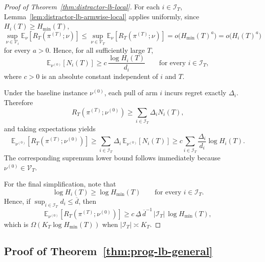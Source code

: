 \documentclass[11pt]{article}
\begin{document}
\begin{proof}[Proof of Theorem~\ref{thm:distractor-lb-local}]
For each $i\in\mathcal I_T$, Lemma~\ref{lem:distractor-lb-armwise-local}
applies uniformly, since $H_i(T)\ge H_{\min}(T),$
\[
\sup_{\nu\in\mathcal V_i}\mathbb E_\nu[R_T(\pi^{(T)};\nu)]
\le
\sup_{\nu\in\mathcal V_T}\mathbb E_\nu[R_T(\pi^{(T)};\nu)]
=
o\bigl(H_{\min}(T)^a\bigr)
=
o\bigl(H_i(T)^a\bigr)
\]
for every $a>0$. Hence, for all sufficiently large $T$,
\[
\mathbb E_{\nu^{(0)}}[N_i(T)]
\ge
c\,\frac{\log H_i(T)}{d_i}
\qquad
\text{for every }i\in\mathcal I_T,
\]
where $c>0$ is an absolute constant independent of $i$ and $T$.

Under the baseline instance $\nu^{(0)}$, each pull of arm $i$ incurs regret
exactly $\Delta_i$. Therefore
\[
R_T(\pi^{(T)};\nu^{(0)})
\ge
\sum_{i\in\mathcal I_T}\Delta_i N_i(T),
\]
and taking expectations yields
\[
\mathbb E_{\nu^{(0)}}[R_T(\pi^{(T)};\nu^{(0)})]
\ge
\sum_{i\in\mathcal I_T}\Delta_i\,\mathbb E_{\nu^{(0)}}[N_i(T)]
\ge
c\sum_{i\in\mathcal I_T}\frac{\Delta_i}{d_i}\log H_i(T).
\]
The corresponding supremum lower bound follows immediately because
$\nu^{(0)}\in\mathcal V_T$.

For the final simplification, note that
\[
\log H_i(T)\ge \log H_{\min}(T)
\qquad
\text{for every }i\in\mathcal I_T.
\]
Hence, if $\sup_{i\in\mathcal I_T}d_i\le \overline d$, then
\[
\mathbb E_{\nu^{(0)}}[R_T(\pi^{(T)};\nu^{(0)})]
\ge
c\,\underline\Delta\,\overline d^{-1}\,|\mathcal I_T|\,\log H_{\min}(T),
\]
which is $\Omega(K_T\log H_{\min}(T))$ when
$|\mathcal I_T|\asymp K_T$.
\end{proof}

\subsection{Proof of Theorem~\ref{thm:prog-lb-general}}
\label{sec:Proof of thm:prog-lb-general}
\end{document}
